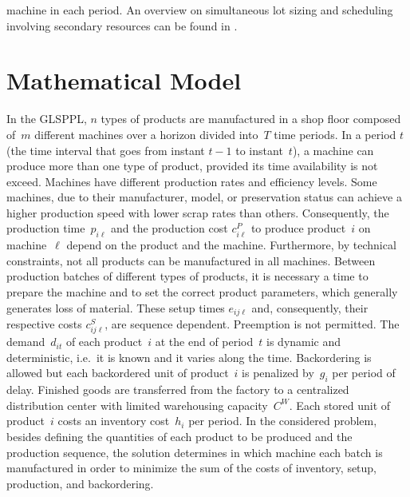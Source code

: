 \documentclass[11pt]{article}
\begin{document}
machine in each period. An overview on simultaneous lot sizing and scheduling involving secondary resources can be found in \cite{worbe2019}.

\section{Mathematical Model} \label{secmodel}

In the GLSPPL, $n$ types of products are manufactured in a shop floor composed of~$m$ different machines over a horizon divided into~$T$ time periods. In a period $t$ (the time interval that goes from instant $t-1$ to instant~$t$), a machine can produce more than one type of product, provided its time availability is not exceed. Machines have different production rates and efficiency levels. Some machines, due to their manufacturer, model, or preservation status can achieve a higher production speed with lower scrap rates than others. Consequently, the production time~$p_{i \ell}$ and the production cost $c^P_{i \ell}$ to produce product~$i$ on machine~$\ell$ depend on the product and the machine. Furthermore, by technical constraints, not all products can be manufactured in all machines. Between production batches of different types of products, it is necessary a time to prepare the machine and to set the correct product parameters, which generally generates loss of material. These setup times $e_{i j \ell}$ and, consequently, their respective costs $c^S_{ij\ell}$, are sequence dependent. Preemption is not permitted. The demand~$d_{it}$ of each product~$i$ at the end of period~$t$ is dynamic and deterministic, i.e.\ it is known and it varies along the time. Backordering is allowed but each backordered unit of product~$i$ is penalized by~$g_i$ per period of delay. Finished goods are transferred from the factory to a centralized distribution center with limited warehousing capacity~$C^W$. Each stored unit of product~$i$ costs an inventory cost~$h_i$ per period. In the considered problem, besides defining the quantities of each product to be produced and the production sequence, the solution determines in which machine each batch is manufactured in order to minimize the sum of the costs of inventory, setup, production, and backordering.
\end{document}
